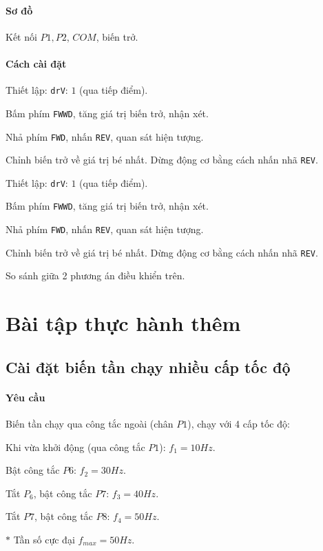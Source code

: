 \documentclass[13pt,a4paper]{extarticle}
\begin{document}
\paragraph{Sơ đồ}Kết nối $P1,P2$, $COM$, biến trở.
\paragraph{Cách cài đặt}
\begin{list}{--}{}
\item Thiết lập: \verb|drV|: $1$ (qua tiếp điểm).
\item Bấm phím \verb|FWWD|, tăng giá trị biến trở, nhận xét.
\item Nhả phím \verb|FWD|, nhấn \verb|REV|, quan sát hiện tượng.
\item Chỉnh biến trở về giá trị bé nhất. Dừng động cơ bằng cách nhấn nhã \verb|REV|.
\item Thiết lập: \verb|drV|: $1$ (qua tiếp điểm).
\item Bấm phím \verb|FWWD|, tăng giá trị biến trở, nhận xét.
\item Nhả phím \verb|FWD|, nhấn \verb|REV|, quan sát hiện tượng.
\item Chỉnh biến trở về giá trị bé nhất. Dừng động cơ bằng cách nhấn nhã \verb|REV|.
\item So sánh giữa 2 phương án điều khiển trên.
\end{list}
\newpage
\section{Bài tập thực hành thêm}
\subsection{Cài đặt biến tần chạy nhiều cấp tốc độ}
\paragraph{Yêu cầu}Biến tần chạy qua công tắc ngoài (chân $P1$), chạy với 4 cấp tốc độ:
\begin{list}{--}{}
\item Khi vừa khởi động (qua công tắc $P1$): $f_1 = 10Hz$.
\item Bật công tắc $P6$: $f_2 = 30Hz$.
\item Tắt $P_6$, bật công tắc $P7$: $f_3 = 40Hz$.
\item Tắt $P7$, bật công tắc $P8$: $f_4 = 50Hz$.
\item[$\ast$] Tần số cực đại $f_{max} = 50Hz$.
\end{list}
\end{document}
